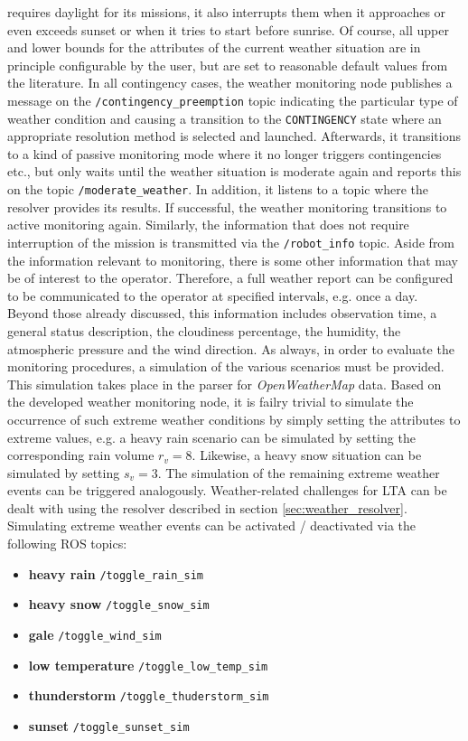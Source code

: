 \documentclass[english, master, utf8]{base/thesis_KBS}
\newcommand{\code}[1]{\colorbox{light-gray}{\texttt{#1}}}
\begin{document}
requires daylight for its missions, it also interrupts them when it approaches or even exceeds sunset or when it tries to start before sunrise. Of course, all upper and lower bounds
for the attributes of the current weather situation are in principle configurable by the user, but are set to reasonable default values from the literature.  In all contingency
cases, the weather monitoring node publishes a message on the \code{/contingency\_preemption} topic indicating the particular type of weather condition and causing a transition to
the \code{CONTINGENCY} state where an appropriate resolution method is selected and launched. Afterwards, it transitions to a kind of passive monitoring mode where it no longer
triggers contingencies etc., but only waits until the weather situation is moderate again and reports this on the topic \code{/moderate\_weather}. In addition, it listens to a
topic where the resolver provides its results. If successful, the weather monitoring transitions to active monitoring again.
Similarly, the information that does not require interruption of the mission is transmitted via the \code{/robot\_info} topic. Aside from the
information relevant to monitoring, there is some other information that may be of interest to the operator. Therefore, a full weather report can be configured to be communicated
to the operator at specified intervals, e.g. once a day. Beyond those already discussed, this information includes observation time, a general status description, the cloudiness
percentage, the humidity, the atmospheric pressure and the wind direction.\newline
As always, in order to evaluate the monitoring procedures, a simulation of the various scenarios must be provided. This simulation takes place in the parser for
\textit{OpenWeatherMap} data. Based on the developed weather monitoring node, it is failry trivial to simulate the occurrence of such extreme weather conditions by simply setting
the attributes to extreme values, e.g. a heavy rain scenario can be simulated by setting the corresponding rain volume $r_v = 8$. Likewise, a heavy snow situation can be simulated
by setting $s_v = 3$. The simulation of the remaining extreme weather events can be triggered analogously. Weather-related challenges for LTA can be dealt with using the resolver
described in section \ref{sec:weather_resolver}. Simulating extreme weather events can be activated / deactivated via the following ROS topics:
\begin{itemize}
    \item \textbf{heavy rain} \textrightarrow \code{/toggle\_rain\_sim}
    \item \textbf{heavy snow} \textrightarrow \code{/toggle\_snow\_sim}
    \item \textbf{gale} \textrightarrow \code{/toggle\_wind\_sim}
    \item \textbf{low temperature} \textrightarrow \code{/toggle\_low\_temp\_sim}
    \item \textbf{thunderstorm} \textrightarrow \code{/toggle\_thuderstorm\_sim}
    \item \textbf{sunset} \textrightarrow \code{/toggle\_sunset\_sim}
\end{itemize}
\end{document}
